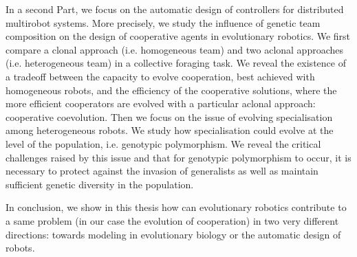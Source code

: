 	In a second Part, we focus on the automatic design of controllers for distributed multirobot systems. More precisely, we study the influence of genetic team composition on the design of cooperative agents in evolutionary robotics. We first compare a clonal approach (i.e. homogeneous team) and two aclonal approaches (i.e. heterogeneous team) in a collective foraging task. We reveal the existence of a tradeoff between the capacity to evolve cooperation, best achieved with homogeneous robots, and the efficiency of the cooperative solutions, where the more efficient cooperators are evolved with a particular aclonal approach: cooperative coevolution. Then we focus on the issue of evolving specialisation among heterogeneous robots. We study how specialisation could evolve at the level of the population, i.e. genotypic polymorphism. We reveal the critical challenges raised by this issue and that for genotypic polymorphism to occur, it is necessary to protect against the invasion of generalists as well as maintain sufficient genetic diversity in the population.

	In conclusion, we show in this thesis how can evolutionary robotics contribute to a same problem (in our case the evolution of cooperation) in two very different directions: towards modeling in evolutionary biology or the automatic design of robots.